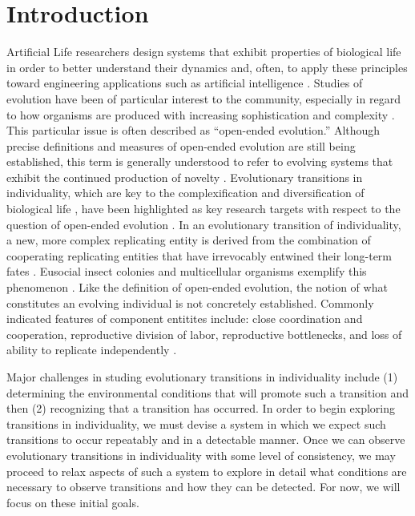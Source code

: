 \section{Introduction}

Artificial Life researchers design systems that exhibit properties of biological life in order to better understand their dynamics and, often, to apply these principles toward engineering applications such as artificial intelligence \citep{bedau2003artificial}.
Studies of evolution have been of particular interest to the community, especially in regard to how organisms are produced with increasing sophistication and complexity \citep{goldsby2017increasing}.
This particular issue is often described as ``open-ended evolution.''
Although precise definitions and measures of open-ended evolution are still being established, this term is generally understood to refer to evolving systems that exhibit the continued production of novelty \citep{taylor2016open}.
Evolutionary transitions in individuality, which are key to the complexification and diversification of biological life \citep{smith1997major}, have been highlighted as key research targets with respect to the question of open-ended evolution \citep{ray1996evolving, banzhaf2016defining}.
In an evolutionary transition of individuality, a new, more complex replicating entity is derived from the combination of cooperating replicating entities that have irrevocably entwined their long-term fates \citep{west2015major}.
Eusocial insect colonies and multicellular organisms exemplify this phenomenon \citep{smith1997major}.
Like the definition of open-ended evolution, the notion of what constitutes an evolving individual is not concretely established.
Commonly indicated features of component entitites include:
close coordination and cooperation, reproductive division of labor, reproductive bottlenecks, and loss of ability to replicate independently
\citep{ereshefsky2015rethinking, bouchard2013symbiotic}.

Major challenges in studing evolutionary transitions in individuality include (1) determining the environmental conditions that will promote such a transition and then (2) recognizing that a transition has occurred. In order to begin exploring transitions in individuality, we must devise a system in which we expect such transitions to occur repeatably and in a detectable manner.
Once we can observe evolutionary transitions in individuality with some level of consistency, we may proceed to relax aspects of such a system to explore in detail what conditions are necessary to observe transitions and how they can be detected.  For now, we will focus on these initial goals.

